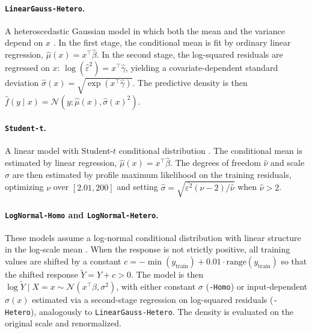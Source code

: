 \documentclass{article}
\newcommand{\method}[1]{\texttt{#1}}
\begin{document}
\paragraph{\method{LinearGauss-Hetero}.}
A heteroscedastic Gaussian model in which both the mean and the variance depend
on $x$ \citep{rigby2005generalized,kneib2023rage}. In the first stage, the
conditional mean is fit by ordinary linear regression,
$\hat\mu(x)=x^\top\hat\beta$. In the second stage, the log-squared residuals are
regressed on $x$:
$\log(\hat\varepsilon^2)=x^\top\hat\gamma$, yielding a covariate-dependent
standard deviation
$\hat\sigma(x)=\sqrt{\exp(x^\top\hat\gamma)}$. The predictive density is then
$\hat f(y\mid x)=\mathcal N(y;\hat\mu(x),\hat\sigma(x)^2)$.

\paragraph{\method{Student-t}.}
A linear model with Student-$t$ conditional distribution
\citep{rigby2005generalized,kneib2023rage,klein2024distributional}. The
conditional mean is estimated by linear regression,
$\hat\mu(x)=x^\top\hat\beta$. The degrees of freedom $\hat\nu$ and scale
$\hat\sigma$ are then estimated by profile maximum likelihood on the training
residuals, optimizing $\nu$ over $[2.01,200]$ and setting
$\hat\sigma=\sqrt{\overline{\varepsilon^2}(\hat\nu-2)/\hat\nu}$ when
$\hat\nu>2$.

\paragraph{\method{LogNormal-Homo} and \method{LogNormal-Hetero}.}
These models assume a log-normal conditional distribution with linear structure
in the log-scale mean \citep{rigby2005generalized,kneib2023rage}. When the
response is not strictly positive, all training values are shifted by a
constant
$c=-\min(y_{\text{train}})+0.01\cdot\mathrm{range}(y_{\text{train}})$
so that the shifted response $\tilde Y=Y+c>0$. The model is then
$\log \tilde Y\mid X=x \sim \mathcal N(x^\top\beta,\sigma^2)$, with either
constant $\sigma$ (\method{-Homo}) or input-dependent $\sigma(x)$ estimated via
a second-stage regression on log-squared residuals (\method{-Hetero}),
analogously to \method{LinearGauss-Hetero}. The density is evaluated on the
original scale and renormalized.
\end{document}
